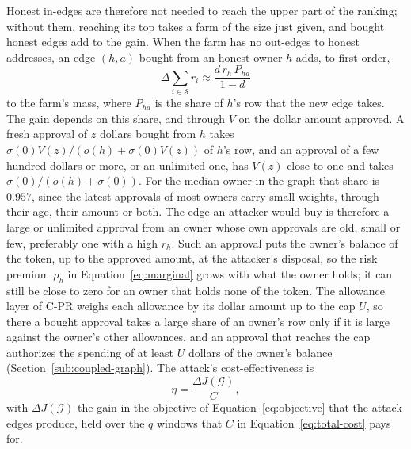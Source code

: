 Honest in-edges are therefore not needed to reach the upper part of the ranking; without them, reaching its top takes a farm of the size just given, and bought honest edges add to the gain. When the farm has no out-edges to honest addresses, an edge $(h,a)$ bought from an honest owner $h$ adds, to first order,
\begin{equation*}
\Delta\sum_{i\in\mathcal{S}} r_i \approx \frac{d\,r_h\,P_{ha}}{1-d}
\end{equation*}
to the farm's mass, where $P_{ha}$ is the share of $h$'s row that the new edge takes. The gain depends on this share, and through $V$ on the dollar amount approved. A fresh approval of $z$ dollars bought from $h$ takes $\sigma(0)V(z)/(o(h)+\sigma(0)V(z))$ of $h$'s row, and an approval of a few hundred dollars or more, or an unlimited one, has $V(z)$ close to one and takes $\sigma(0)/(o(h)+\sigma(0))$. For the median owner in the graph that share is $0.957$, since the latest approvals of most owners carry small weights, through their age, their amount or both. The edge an attacker would buy is therefore a large or unlimited approval from an owner whose own approvals are old, small or few, preferably one with a high $r_h$. Such an approval puts the owner's balance of the token, up to the approved amount, at the attacker's disposal, so the risk premium $\rho_h$ in Equation~\eqref{eq:marginal} grows with what the owner holds; it can still be close to zero for an owner that holds none of the token. The allowance layer of C-PR weighs each allowance by its dollar amount up to the cap $U$, so there a bought approval takes a large share of an owner's row only if it is large against the owner's other allowances, and an approval that reaches the cap authorizes the spending of at least $U$ dollars of the owner's balance (Section~\ref{sub:coupled-graph}). The attack's cost-effectiveness is
\begin{equation}
\label{eq:efficiency}
\eta = \frac{\Delta J(\mathcal{G})}{C},
\end{equation}
with $\Delta J(\mathcal{G})$ the gain in the objective of Equation~\eqref{eq:objective} that the attack edges produce, held over the $q$ windows that $C$ in Equation~\eqref{eq:total-cost} pays for.

